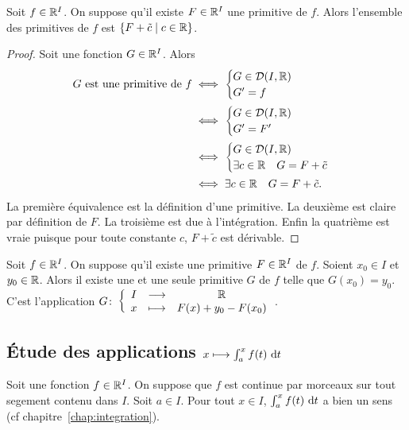 \begin{theo}
  Soit \(f \in \mathbb{R}^I\). On suppose qu'il existe \(F \in \mathbb{R}^I\) une primitive de 
  \(f\). Alors l'ensemble des primitives de \(f\) est \(\left\{F+\tilde{c}\mathrel{}\middle|\mathrel{}c 
  \in \mathbb{R}\right\}\).
\end{theo}
\begin{proof}
  Soit une fonction \(G \in \mathbb{R}^I\). Alors
  \begin{align*}
    G \text{~est une primitive de~} f &\iff \begin{cases} G \in \mathcal{D}(I,\mathbb{R}) \\ 
    G' = f \end{cases} \\
    &\iff \begin{cases} G \in \mathcal{D}(I,\mathbb{R}) \\ G' = F' \end{cases} \\ &\iff 
      \begin{cases} G \in \mathcal{D}(I,\mathbb{R}) \\ \exists c \in \mathbb{R} \quad G = F+\tilde{c} 
      \end{cases} \\
      &\iff \exists c \in \mathbb{R} \quad G = F+\tilde{c}.
  \end{align*}
  La première équivalence est la définition d'une primitive. La deuxième est 
  claire par définition de \(F\). La troisième est due à l'intégration. Enfin la 
  quatrième est vraie puisque pour toute constante \(c\), \(F+\tilde{c}\) est 
  dérivable.
\end{proof}

\begin{corth}
  Soit \(f \in \mathbb{R}^I\). On suppose qu'il existe une primitive \(F \in \mathbb{R}^I\) de 
  \(f\). Soient \(x_0 \in I\) et \(y_0 \in \mathbb{R}\). Alors il existe une et une 
  seule primitive \(G\) de \(f\) telle que \(G(x_0) = y_0\). C'est l'application 
  \(G\colon\left\{\begin{array}{ccc}I & \longrightarrow &\mathbb{R}\\x & \longmapsto & F(x)+y_0-F(x_0)\end{array}\right.\).
\end{corth}

\subsection{Étude des applications \(x \longmapsto \int_a^x f(t)\,\mathop{}\mathopen{}\mathrm{d} t\)}

Soit une fonction \(f \in \mathbb{R}^I\). On suppose que \(f\) est continue par morceaux 
sur tout segement contenu dans \(I\). Soit \(a \in I\). Pour tout \(x \in I\), 
\(\int_a^xf(t)\,\mathop{}\mathopen{}\mathrm{d} t\) a bien un sens (cf chapitre~\ref{chap:integration}).

